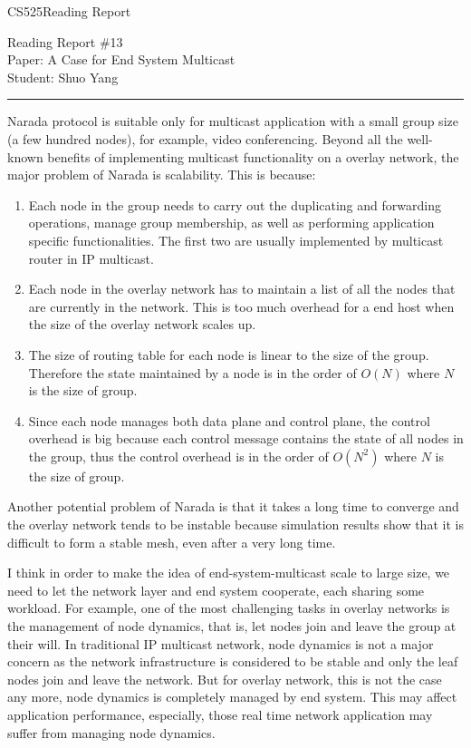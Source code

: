 \documentclass[11pt]{article}
\def\CourseCode{CS525}
\def\ReportNo{13}
\def\Category{Reading Report}
\def\PaperTitle{A Case for End System Multicast}
\def\Author{Shuo Yang}
\begin{document}
\noindent

\CourseCode \hfill \Category

\begin{center}
Reading Report \#\ReportNo\\
Paper: \PaperTitle\\
Student: \Author\\
\end{center}

\hrule\smallskip
\vspace{1.5em}

Narada protocol is suitable only for multicast application with a
small group size (a few hundred nodes), for example, video
conferencing. Beyond all the well-known 
benefits of implementing multicast functionality on a overlay network,
the major problem of Narada is scalability. This is because:

\begin{enumerate}
\item Each node in the group needs to carry out the duplicating and
  forwarding operations, manage group membership, as well as
  performing application specific functionalities. The first two are
  usually implemented by multicast router in IP multicast.
\item Each node in the overlay network has to maintain a list of all
  the nodes that are currently in the network. This is too much
  overhead for a end host when the size of the overlay network scales
  up.
\item The size of routing table for each node is linear to the size of
  the group. Therefore the state maintained by a node is in the order
  of $O(N)$ where $N$ is the size of group.
\item Since each node manages both data plane and control plane, the
  control overhead is big because each control message contains the
  state of all nodes in the group, thus the control overhead is in the
  order of $O(N^2)$ where $N$ is the size of group.
\end{enumerate}

Another potential problem of Narada is that it takes a long time to
converge and the overlay network tends to be instable because
simulation results show that it is difficult to form a stable mesh,
even after a very long time. 

\vspace{1em}
I think in order to make the idea of end-system-multicast scale to
large size, we need to let the network layer and end system cooperate,
each sharing some workload. For example, one of the most challenging
tasks in overlay networks is the management of node dynamics, that is,
let nodes join and leave the group at their will. In traditional IP
multicast network, node dynamics is not a major concern as the
network infrastructure is considered to be stable and only the leaf
nodes join and leave the network. But for overlay network, this is not
the case any more, node dynamics is completely managed by end system.
This may affect application performance, especially, those real time
network application may suffer from managing node dynamics. 
\end{document}
